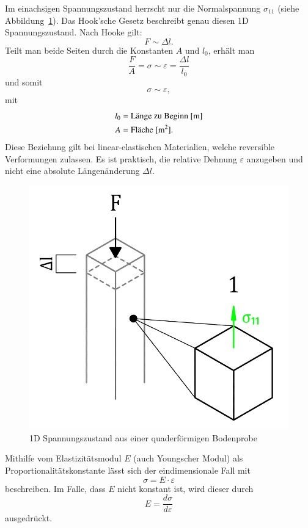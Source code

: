 Im einachsigen Spannungszustand herrscht nur die Normalspannung $\sigma_{11}$ (siehe Abbildung~\ref{fig:Bild1}).
Das Hook'sche Gesetz beschreibt genau diesen 1D Spannungszustand.
Nach Hooke gilt:
\[
F
\sim
\Delta l
.
\]
Teilt man beide Seiten durch die Konstanten $A$ und $l_0$, erhält man
\[
\frac{F}{A}
=
\sigma
\sim
\varepsilon
=
\frac{\Delta l}{l_0}
\]
und somit
\[
\sigma
\sim
\varepsilon
,
\]
mit
\begin{align*}
	l_0 &= \text{Länge zu Beginn [\si{\meter}]} \\
	  A &= \text{Fläche [\si{\meter\squared}].}
\end{align*}
Diese Beziehung gilt bei linear-elastischen Materialien, welche reversible Verformungen zulassen.
Es ist praktisch, die relative Dehnung $\varepsilon$ anzugeben und nicht eine absolute Längenänderung $\Delta l$.
%
%
%
\begin{figure}
	\centering
	\includegraphics[width=0.35\linewidth,keepaspectratio]{papers/spannung/Grafiken/Bild1.png}
	\caption{1D Spannungszustand aus einer quaderförmigen Bodenprobe}
	\label{fig:Bild1}
\end{figure}
Mithilfe vom Elastizitätsmodul $E$ (auch Youngscher Modul) als Proportionalitätskonstante lässt sich der eindimensionale Fall mit
\[
\sigma
=
E\cdot\varepsilon
\]
beschreiben.
Im Falle, dass $E$ nicht konstant ist, wird dieser durch
\[
E
=
\frac{d\sigma}{d\varepsilon}
\]
ausgedrückt.
